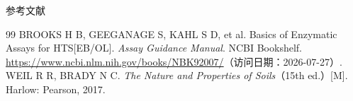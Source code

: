 \documentclass[aspectratio=169,10pt,fontset=fandol]{ctexbeamer}
\begin{document}
\begin{frame}[t,fragile]{参考文献}
\normalsize
{\normalsize
\begin{thebibliography}{99}
 BROOKS H B, GEEGANAGE S, KAHL S D, et al. Basics of Enzymatic Assays for HTS[EB/OL]. \emph{Assay Guidance Manual}. NCBI Bookshelf. \url{https://www.ncbi.nlm.nih.gov/books/NBK92007/}（访问日期：2026-07-27）.
 WEIL R R, BRADY N C. \emph{The Nature and Properties of Soils}（15th ed.）[M]. Harlow: Pearson, 2017.
\end{thebibliography}
}
\end{frame}
\end{document}
